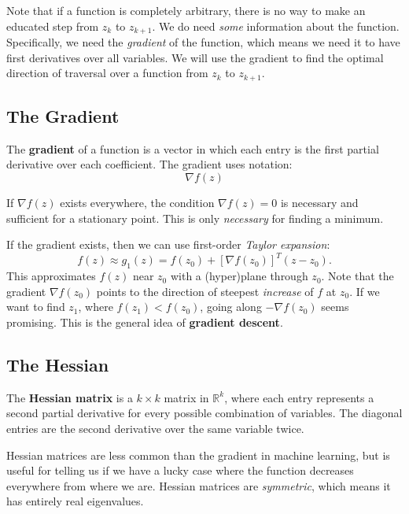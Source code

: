 \documentclass[titlepage, 12pt, leqno]{article}
\begin{document}
Note that if a function is completely arbitrary, there is no way to make an 
educated step from $z_{k}$ to $z_{k+1}$. We do need \textit{some} information
about the function. Specifically, we need the \textit{gradient} of the function,
which means we need it to have first derivatives over all variables. We will use
the gradient to find the optimal direction of traversal over a function from
$z_{k}$ to $z_{k+1}$.

\subsection{The Gradient}
\begin{definition}
    The \textbf{gradient} of a function is a vector in which each entry is the
    first partial derivative over each coefficient. The gradient uses notation:
    \[
        \nabla f(z)
    \]
\end{definition}

If $\nabla f(z)$ exists everywhere, the condition $\nabla f(z) = 0$ is necessary 
and sufficient for a stationary point. This is only \textit{necessary} for
finding a minimum.

If the gradient exists, then we can use first-order \textit{Taylor expansion}:
\[
    f(z) \approx g_{1}(z) = f(z_{0}) + \left[\nabla f(z_{0})\right]^{T}(z-z_{0}).
\]
This approximates $f(z)$ near $z_{0}$ with a (hyper)plane through $z_{0}$. Note
that the gradient $\nabla f(z_{0})$ points to the direction of steepest
\textit{increase} of $f$ at $z_{0}$. If we want to find $z_{1}$, where
$f(z_{1}) < f(z_{0})$, going along $-\nabla f(z_{0})$ seems promising. This is
the general idea of \textbf{gradient descent}.

\pagebreak
\subsection{The Hessian}

\begin{definition}
    The \textbf{Hessian matrix} is a $k\times k$ matrix in $ \mathbb{R}^{k}$,
    where each entry represents a second partial derivative for every possible
    combination of variables. The diagonal entries are the second derivative 
    over the same variable twice.
\end{definition}

Hessian matrices are less common than the gradient in machine learning, but is
useful for telling us if we have a lucky case where the function decreases 
everywhere from where we are. Hessian matrices are \textit{symmetric}, which means
it has entirely real eigenvalues.
\end{document}
